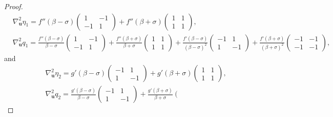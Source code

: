 \documentclass[11pt,a4paper,reqno]{amsart}
\numberwithin{equation}{section}
\theoremstyle{definition}
\theoremstyle{remark}
\newcommand{\bu}{\mathbf{u}}
\begin{document}
{\begin{proof}
\begin{equation*}
\begin{aligned}
       &\nabla_\bu^2 \eta_1 = f''(\beta-\sigma) \left( \begin{matrix}
        1 & -1 \\ -1 & 1
    \end{matrix} \right) + f''(\beta+\sigma) \left( \begin{matrix}
        1 & 1 \\ 1 & 1
    \end{matrix} \right), \quad \\ 
    &\nabla^2_\bu q_1 \!\! = \! \frac{f''(\beta-\sigma)}{\beta-\sigma}\!\! \left( \begin{matrix}
        1 & -1 \\ 
        -1 & 1
    \end{matrix} \right) \!\! + \! \frac{f''(\beta+\sigma)}{\beta+\sigma} \!\!\left( \begin{matrix}
        1 & 1 \\ 
       1  & 1
    \end{matrix}  \right) \!\!+\! \frac{f'(\beta-\sigma)}{(\beta-\sigma)^2}\!\!\left( \begin{matrix}
        -1 & 1 \\ 
       1  & -1
    \end{matrix}  \right) \!\! +\! \frac{f'(\beta+\sigma)}{(\beta+\sigma)^2} \!\!\left( \begin{matrix}
        -1 & -1 \\ 
       -1  & -1
    \end{matrix}  \right), 
   \end{aligned}
\end{equation*}
and 
\begin{equation*}
    \begin{aligned}
        &\nabla^2_\bu \eta_2 = g'(\beta-\sigma) \left( \begin{matrix}
            -1 & 1 \\ 
            1 & -1
        \end{matrix}\right) + g'(\beta+\sigma) \left( \begin{matrix}
            1 & 1 \\ 
            1 & 1
        \end{matrix}\right), \\ 
        &\nabla^2_\bu q_2 \!\! = \! \frac{g'(\beta-\sigma)}{\beta-\sigma}\!\! \left( \begin{matrix}
        -1 & 1 \\ 
        1 & -1
    \end{matrix} \right) \!\! + \! \frac{g'(\beta+\sigma)}{\beta+\sigma} \!\!\left( \begin{matrix}

\end{matrix}
\end{aligned}
\end{equation*}
\end{proof}}
\end{document}
